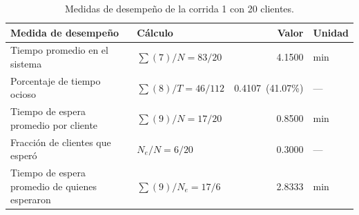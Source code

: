 \begin{table}[H]
\centering
\caption{Medidas de desempe\~no de la corrida 1 con 20 clientes.}
\label{tab:meas20}
\small\setlength{\tabcolsep}{5pt}
\begin{tabular}{@{}llrl@{}}
\toprule
Medida de desempe\~no & C\'alculo & Valor & Unidad \\
\midrule
Tiempo promedio en el sistema & $\sum(7)/N = 83/20$ & 4.1500 & min \\
Porcentaje de tiempo ocioso & $\sum(8)/T = 46/112$ & 0.4107\ (41.07\%) & --- \\
Tiempo de espera promedio por cliente & $\sum(9)/N = 17/20$ & 0.8500 & min \\
Fracci\'on de clientes que esper\'o & $N_{e}/N = 6/20$ & 0.3000 & --- \\
Tiempo de espera promedio de quienes esperaron & $\sum(9)/N_{e} = 17/6$ & 2.8333 & min \\
\bottomrule
\end{tabular}
\end{table}